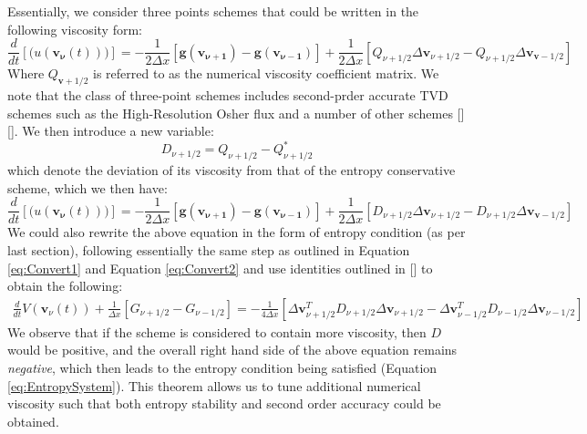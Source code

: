\documentclass[a4paper]{article}
\numberwithin{equation}{section}
\begin{document}
Essentially, we consider three points schemes that could be written in the following viscosity form:
\begin{equation} \label{eq:EntropyConservedScheme_Viscosity_form}
    \frac{d}{dt}\left[\mathbf(
    u(\mathbf{v_\nu}(t)))\right] = - \frac{1}{2\Delta x} \left[\mathbf
    {g}(\mathbf{v_{\nu+1}}) - \mathbf{g}(\mathbf{v_{\nu-1}})\right] + \frac{1}{2\Delta x} \left[Q_{\nu + 1/2} \Delta \mathbf{v}_{\nu+1/2} - Q_{\nu + 1/2} \Delta \mathbf{v}_{\mathbf{v}-1/2}\right]
\end{equation}
Where $Q_{\mathbf{v}+1/2}$ is referred to as the numerical viscosity coefficient matrix. We note that the class of three-point schemes includes second-prder accurate TVD schemes such as the High-Resolution Osher flux and a number of other schemes [][]. We then introduce a new variable:
\begin{equation}
    D_{\nu + 1/2} = Q_{\nu + 1/2} - Q_{\nu + 1/2}^*
\end{equation}
which denote the deviation of its viscosity from that of the entropy conservative scheme, which we then have:
\begin{equation}
    \frac{d}{dt}\left[\mathbf(
    u(\mathbf{v_\nu}(t)))\right] = - \frac{1}{2\Delta x} \left[\mathbf
    {g}(\mathbf{v_{\nu+1}}) - \mathbf{g}(\mathbf{v_{\nu-1}})\right] + \frac{1}{2\Delta x} \left[D_{\nu + 1/2} \Delta \mathbf{v}_{\nu+1/2} - D_{\nu + 1/2} \Delta \mathbf{v}_{\mathbf{v}-1/2}\right]
\end{equation}
We could also rewrite the above equation in the form of entropy condition (as per last section), following essentially the same step as outlined in Equation \ref{eq:Convert1} and Equation \ref{eq:Convert2} and use identities outlined in [] to obtain the following:
\begin{equation}
    \begin{split}
        \frac{d}{dt} V(\mathbf{v}_\nu(t)) + \frac{1}{\Delta x}\left[G_{\nu + 1/2} - G_{\nu - 1/2}\right] = -\frac{1}{4\Delta x} \left[\Delta \mathbf{v}_{\nu+1/2}^T D_{\nu + 1/2} \Delta \mathbf{v}_{\nu+1/2} - \Delta \mathbf{v}_{\nu-1/2}^T D_{\nu - 1/2} \Delta \mathbf{v}_{\nu-1/2}\right]
    \end{split}
\end{equation}
We observe that if the scheme is considered to contain more viscosity, then $D$ would be positive, and the overall right hand side of the above equation remains \textit{negative}, which then leads to the entropy condition being satisfied (Equation \ref{eq:EntropySystem}). This theorem allows us to tune additional numerical viscosity such that both entropy stability and second order accuracy could be obtained.
\end{document}
